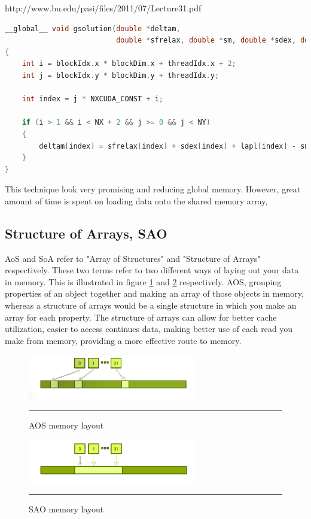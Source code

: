 http://www.bu.edu/pasi/files/2011/07/Lecture31.pdf


\begin{lstlisting}[language=C++, label={lst:consingle}, caption={Evaluation of individual coordinates of the Zhang and Li model}]
__global__ void gsolution(double *deltam,
					      double *sfrelax, double *sm, double *sdex, double *lapl)
{
    int i = blockIdx.x * blockDim.x + threadIdx.x + 2;
    int j = blockIdx.y * blockDim.y + threadIdx.y;
 
    int index = j * NXCUDA_CONST + i;

    if (i > 1 && i < NX + 2 && j >= 0 && j < NY)
    {
        deltam[index] = sfrelax[index] + sdex[index] + lapl[index] - sm[index];
    }
}
\end{lstlisting}

This technique look very promising and reducing global memory. However, great amount of time is spent on loading data onto the shared memory array,

\subsection{Structure of Arrays, SAO}


AoS and SoA refer to "Array of Structures" and "Structure of Arrays" respectively. These two terms refer to two different ways of laying out your data in memory. This is illustrated in figure \ref{fig:aos} and \ref{fig:sao} respectively. AOS, grouping properties of an object together and making an array of those objects in memory, whereas a structure of arrays would be a single structure in which you make an array for each property. The structure of arrays can allow for better cache utilization, easier to access continues data, making better use of each read you make from memory, providing a more effective route to memory. 

\begin{figure}[htbp]
	\centering
		\includegraphics[width=0.65\textwidth]{Figures/aos.png}
		\rule{35em}{0.2pt}
	\caption[Array of structures (AOS)]{AOS memory layout }
	\label{fig:aos}
\end{figure}


\begin{figure}[htbp]
	\centering
		\includegraphics[width=0.65\textwidth]{Figures/soa.png}
		\rule{35em}{0.2pt}
	\caption[Structure of Arrays (SAO)]{SAO memory layout}
	\label{fig:sao}
\end{figure}


